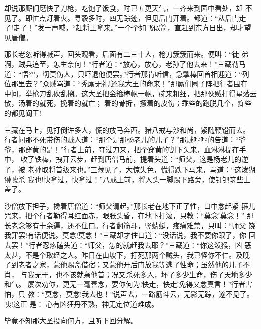 却说那厮们磨快了刀枪，吃饱了饭食，时已五更天气，一齐来到园中看处，却
不见了。即忙点灯着火。寻彀多时，四无踪迹，但见后门开着。都道：“从后门走
了!走了！”发一声喊，“赶将上拿来。”一个个如飞似箭，直赶到东方日出，却才望
见唐僧。

那长老忽听得喊声，回头观看，后面有二三十人，枪刀簇簇而来。便叫：“徒
弟啊，贼兵追至，怎生奈何！”行者道：“放心，放心，老孙了他去来！”三藏勒马
道：“悟空，切莫伤人，只吓退他便罢。”行者那肯听信，急掣棒回首相迎道：“列
位那里去？”众贼骂道：“秃厮无礼!还我大王的命来！”那厮们圈子阵把行者围在
中间，举枪刀乱砍乱搠。这大圣把金箍棒幌一幌，碗来粗细，把那伙贼打得星落云
散，汤着的就死，挽着的就亡；着的骨折，擦着的皮伤；乖些的跑脱几个，痴些
的都见阎王!

三藏在马上，见打倒许多人，慌的放马奔西。猪八戒与沙和尚，紧随鞭镫而去。
行者问那不死带伤的贼人道：“那个是那杨老儿的儿子？”那贼哼哼的告道：“爷
爷，那穿黄的是！”行者上前，夺过刀来，把个穿黄的割下头来，血淋淋提在手中，
收了铁棒，拽开云步，赶到唐僧马前，提着头道：“师父，这是杨老儿的逆子，被
老孙取将首级来也。”三藏见了，大惊失色，慌得跌下马来，骂道：“这泼猢狲唬杀
我也!快拿过，快拿过！”八戒上前，将人头一脚踢下路旁，使钉钯筑些土盖了。

沙僧放下担子，搀着唐僧道：“师父请起。”那长老在地下正了性，口中念起紧
箍儿咒来，把个行者勒得耳红面赤，眼胀头昏，在地下打滚，只教：“莫念!莫念！”
那长老念够有十余遍，还不住口。行者翻筋斗，竖蜻蜓，疼痛难禁，只叫：“师父
饶我罪罢!有话便说。莫念!莫念！”三藏却才住口道：“没话说，我不要你跟了，你
回去罢！”行者忍疼磕头道：“师父，怎的就赶我去耶？”三藏道：“你这泼猴，凶
恶太甚，不是个取经之人。昨日在山坡下，打死那两个贼头，我已怪你不仁。及晚
了到老者之家，蒙他赐斋借宿；又蒙他开后门放我等逃了性命；虽然他的儿子不肖，
与我无干，也不该就枭他首；况又杀死多人，坏了多少生命，伤了天地多少和气。
屡次劝你，更无一毫善念，要你何为!快走，快走!免得又念真言！”行者害怕，只
教：“莫念，莫念!我去也！”说声去，一路筋斗云，无影无踪，遂不见了。咦!这正
是：
心有凶狂丹不熟，神无定位道难成。

毕竟不知那大圣投向何方，且听下回分解。